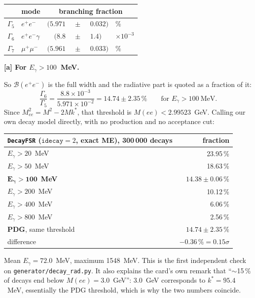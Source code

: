 \documentclass[11pt]{article}
\newcommand{\BR}{\mathcal{B}}
\begin{document}
\begin{center}
\begin{tabular}{llr@{}c@{}ll}
\toprule
& mode & \multicolumn{4}{c}{branching fraction} \\
\midrule
$\Gamma_5$ & $e^+e^-$ & $(5.971$&$\,\pm\,$&$0.032)$ & \% \\
$\Gamma_6$ & \quad $e^+e^-\gamma$ \quad [a] & $(8.8$&$\,\pm\,$&$1.4)$ & $\times10^{-3}$ \\
$\Gamma_7$ & $\mu^+\mu^-$ & $(5.961$&$\,\pm\,$&$0.033)$ & \% \\
\bottomrule
\end{tabular}
\end{center}
\noindent\textbf{[a] For $E_\gamma>100$~MeV.}

So $\BR(e^+e^-)$ is the full width and the radiative part is quoted as a fraction of it:
\begin{equation}
\frac{\Gamma_6}{\Gamma_5}=\frac{8.8\times10^{-3}}{5.971\times10^{-2}}=14.74\pm2.35\,\%
\qquad\text{for }E_\gamma>100~\mathrm{MeV}.
\end{equation}
Since $M_{ee}^2=M^2-2Mk^*$, that threshold is $M(ee)<2.99523$~GeV. Calling our own decay model
directly, with no production and no acceptance cut:

\begin{center}
\begin{tabular}{lr}
\toprule
\texttt{DecayFSR} ($\texttt{idecay}=2$, exact ME), 300\,000 decays & fraction \\
\midrule
$E_\gamma>20$~MeV & 23.95\,\% \\
$E_\gamma>50$~MeV & 18.63\,\% \\
$\mathbf{E_\gamma>100}$~\textbf{MeV} & $\mathbf{14.38\pm0.06\,\%}$ \\
$E_\gamma>200$~MeV & 10.12\,\% \\
$E_\gamma>400$~MeV & 6.06\,\% \\
$E_\gamma>800$~MeV & 2.56\,\% \\
\midrule
\textbf{PDG}, same threshold & $\mathbf{14.74\pm2.35\,\%}$ \\
difference & $-0.36\,\%=0.15\sigma$ \\
\bottomrule
\end{tabular}
\end{center}

Mean $E_\gamma=72.0$~MeV, maximum 1548~MeV. This is the first independent check on
\texttt{generator/decay\_rad.py}. It also explains the card's own remark that ``$\sim$15\,\% of
decays end below $M(ee)=3.0$~GeV'': 3.0~GeV corresponds to $k^*=95.4$~MeV, essentially the PDG
threshold, which is why the two numbers coincide.
\end{document}
